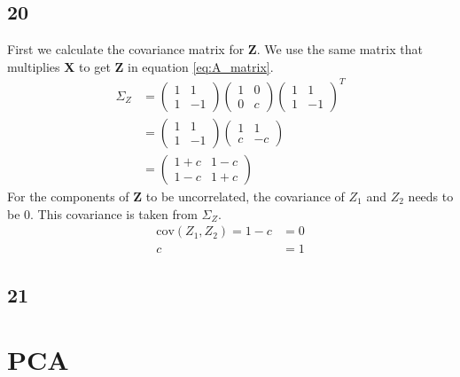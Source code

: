 \documentclass[a4paper,12px]{article}
\begin{document}
\subsection{20}
First we calculate the covariance matrix for \textbf{Z}. We use the same matrix
 that multiplies \textbf{X} to get \textbf{Z} in equation \ref{eq:A_matrix}.
\begin{equation}
    \begin{aligned}
    \Sigma_Z&=\left(\begin{matrix}1&1\\1&-1\end{matrix}\right)
    \left(\begin{matrix}1&0\\0&c\end{matrix}\right)
    \left(\begin{matrix}1&1\\1&-1\end{matrix}\right)^T\\
    &=\left(\begin{matrix}1&1\\1&-1\end{matrix}\right)
    \left(\begin{matrix}1&1\\c&-c\end{matrix}\right)\\
    &=\left(\begin{matrix}1+c&1-c\\1-c&1+c\end{matrix}\right)
    \end{aligned}
\end{equation}
For the components of \textbf{Z} to be uncorrelated, the covariance of $Z_1$
 and $Z_2$ needs to be 0. This covariance is taken from $\Sigma_Z$.
\begin{equation}
    \begin{aligned}
    \text{cov}(Z_1, Z_2)=1-c&=0\\
    c&=1
    \end{aligned}
\end{equation}
\subsection{21}



\section{PCA}
\end{document}
